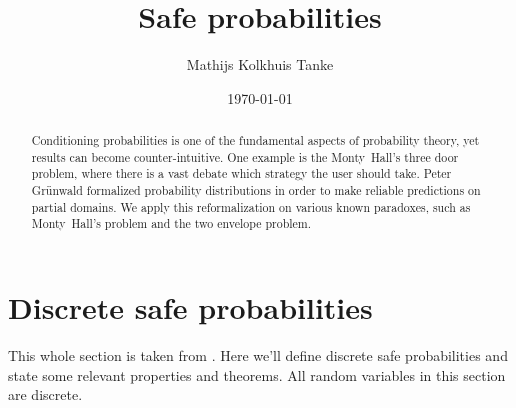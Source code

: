 \documentclass[twoside,a4paper]{article}
\title{Safe probabilities}
\author{Mathijs Kolkhuis Tanke}
\date{\today}
\theoremstyle{plain}
\theoremstyle{definition}
\theoremstyle{remark}
\numberwithin{equation}{section}
\DeclareMathOperator{\1}{\mathbbm{1}}
\begin{document}
\maketitle

\begin{abstract}
Conditioning probabilities is one of the fundamental aspects of probability theory, yet results can become counter-intuitive. One example is the Monty~Hall's three door problem, where there is a vast debate which strategy the user should take. Peter Grünwald \cite{Grunwald16} formalized probability distributions in order to make reliable predictions on partial domains. We apply this reformalization on various known paradoxes, such as Monty~Hall's problem and the two envelope problem.
\end{abstract}

\newpage

\tableofcontents

\newpage

\section{Discrete safe probabilities}
This whole section is taken from \cite{Grunwald16}. Here we'll define discrete safe probabilities and state some relevant properties and theorems. All random variables in this section are discrete.
\end{document}
